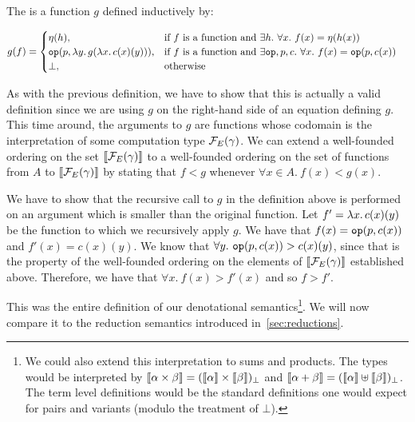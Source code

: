 \begin{definition}
  The  is a function $g$
  defined inductively by:
  
  \begin{align*}
    g(f) &= \begin{cases}
      \eta(h), & \text{if $f$ is a function and $\exists h.\ \forall x.\ f(x) = \eta(h(x))$} \\
      \mathtt{op}(p, \lambda y.\, g(\lambda x.\, c(x)(y))), & \text{if $f$ is a function and $\exists \mathtt{op},p,c.\ \forall x.\ f(x) = \mathtt{op}(p, c(x))$} \\
      \bot, & \text{otherwise} \\
    \end{cases}
  \end{align*}
  
  As with the previous definition, we have to show that this is actually a
  valid definition since we are using $g$ on the right-hand side of an
  equation defining $g$. This time around, the arguments to $g$ are
  functions whose codomain is the interpretation of some computation type
  $\mathcal{F}_E(\gamma)$. We can extend a well-founded ordering on the set
  $\llbracket \mathcal{F}_E(\gamma) \rrbracket$ to a well-founded ordering on the set of functions
  from $A$ to $\llbracket \mathcal{F}_E(\gamma) \rrbracket$ by stating that $f < g$ whenever
  $\forall x \in A.\ f(x) < g(x)$.
  
  We have to show that the recursive call to $g$ in the definition above is
  performed on an argument which is smaller than the original function. Let
  $f' = \lambda x.\, c(x)(y)$ be the function to which we recursively apply
  $g$. We have that $f(x) = \mathtt{op}(p, c(x))$ and $f'(x) = c(x)(y)$. We
  know that $\forall y.\ \mathtt{op}(p, c(x)) > c(x)(y)$, since that is the
  property of the well-founded ordering on the elements of
  $\llbracket \mathcal{F}_E(\gamma) \rrbracket$ established above. Therefore, we have that
  $\forall x.\ f(x) > f'(x)$ and so $f > f'$.
\end{definition}

This was the entire definition of our denotational semantics\footnote{We
  could also extend this interpretation to sums and products. The types
  would be interpreted by
  $\llbracket \alpha \times \beta \rrbracket = (\llbracket \alpha \rrbracket \times \llbracket \beta \rrbracket)_\bot$ and
  $\llbracket \alpha + \beta \rrbracket = (\llbracket \alpha \rrbracket \uplus \llbracket \beta \rrbracket)_\bot$. The term
  level definitions would be the standard definitions one would expect for
  pairs and variants (modulo the treatment of $\bot$).}. We will now
compare it to the reduction semantics introduced in~\ref{sec:reductions}.

